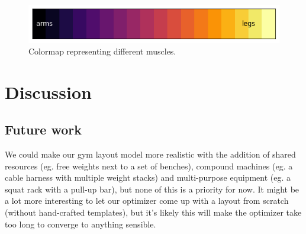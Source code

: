 \documentclass[9pt]{pnas-new}
\begin{document}
\begin{figure}[H]
	\centering
	\includegraphics[width=\textwidth]{workoutTypeColormap.png}
	\caption{Colormap representing different muscles.}\label{fig:colormap}
\end{figure}


\section*{Discussion}

\subsection*{Future work} 

We could make our gym layout model more realistic with the addition of shared resources (eg. free weights next to a set of benches), compound machines (eg. a cable harness with multiple weight stacks) and multi-purpose equipment (eg. a squat rack with a pull-up bar), but none of this is a priority for now.
It might be a lot more interesting to let our optimizer come up with a layout from scratch (without hand-crafted templates), but it's likely this will make the optimizer take too long to converge to anything sensible.
\end{document}
